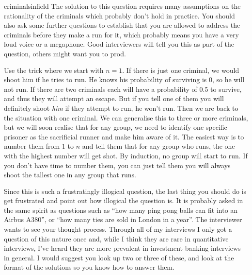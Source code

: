 \begin{answer}{criminalsinfield}
  The solution to this question requires many assumptions on the rationality of the criminals which probably don't hold in practice.
  You should also ask some further questions to establish that you are allowed to address the criminals before they make a run for it, which probably means you have a very loud voice or a megaphone.
  Good interviewers will tell you this as part of the question, others might want you to prod.

  Use the trick where we start with $n=1$.
  If there is just one criminal, we would shoot him if he tries to run.
  He knows his probability of surviving is 0, so he will not run.
  If there are two criminals each will have a probability of 0.5 to survive, and thus they will attempt an escape.
  But if you tell one of them you will definitely shoot \emph{him} if they attempt to run, he won't run.
  Then we are back to the situation with one criminal.
  We can generalise this to three or more criminals, but we will soon realise that for any group, we need to identify one specific prisoner as the sacrificial runner and make him aware of it.
  The easiest way is to number them from $1$ to $n$ and tell them that for any group who runs, the one with the highest number will get shot.
  By induction, no group will start to run.
  If you don't have time to number them, you can just tell them you will always shoot the tallest one in any group that runs.

  Since this is such a frustratingly illogical question, the last thing you should do is get frustrated and point out how illogical the question is.
  It is probably asked in the same spirit as questions such as ``how many ping pong balls can fit into an Airbus A380'', or ``how many ties are sold in London in a year''.
  The interviewer wants to see your thought process.
  Through all of my interviews I only got a question of this nature once and, while I think they are rare in quantitative interviews, I've heard they are more prevalent in investment banking interviews in general.
  I would suggest you look up two or three of these, and look at the format of the solutions so you know how to answer them.
\end{answer}

